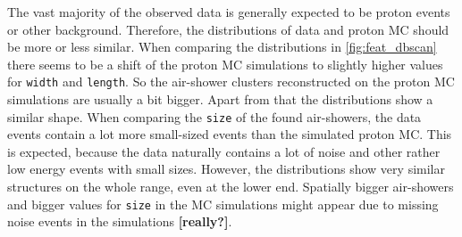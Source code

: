 The vast majority of the observed data is generally expected to be proton
events or other background. Therefore, the distributions of data and proton MC
should be more or less similar. When comparing the distributions in
\autoref{fig:feat_dbscan} there seems to be a shift of the proton MC
simulations to slightly higher values for \texttt{width} and \texttt{length}.
So the air-shower clusters reconstructed on the proton MC simulations are
usually a bit bigger. Apart from that the distributions show a similar shape.
When comparing the \texttt{size} of the found air-showers, the data events
contain a lot more small-sized events than the simulated proton MC. This is
expected, because the data naturally contains a lot of noise and other rather
low energy events with small sizes. However, the distributions show very
similar structures on the whole range, even at the lower end. Spatially bigger
air-showers and bigger values for \texttt{size} in the MC simulations might
appear due to missing noise events in the simulations \textbf{[really?]}.

